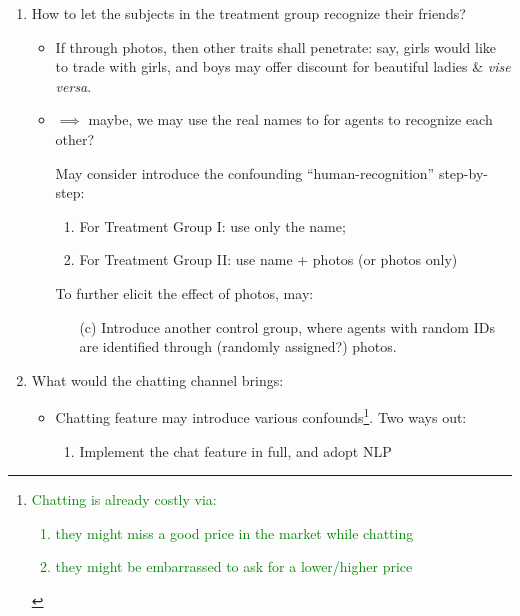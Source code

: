 \documentclass{article}
\begin{document}
\begin{enumerate}
    \item How to let the subjects in the treatment group recognize their
        friends?
        \begin{itemize}
            \item If through photos, then other traits shall penetrate: say,
                girls would like to trade with girls, and boys may offer
                discount for beautiful ladies \& \textit{vise versa}.
            \item $\implies$ maybe, we may use the real names to
                for agents to recognize each other?

                May consider introduce the confounding ``human-recognition''
                step-by-step:
                \begin{enumerate}
                    \item For Treatment Group I: use only the name;
                    \item For Treatment Group II: use name + photos (or photos
                        only)
                \end{enumerate}
                To further elicit the effect of photos, may:
                \begin{itemize}
                    \item[(c)] Introduce another control group, where agents with
                        random IDs are identified through (randomly assigned?)
                        photos.
                \end{itemize}
        \end{itemize}
    \item What would the chatting channel brings:
        \begin{itemize}
            \item Chatting feature may introduce various confounds\footnote{\textcolor{green}{Chatting is already costly via:\\
            \begin{enumerate}
                \item they might miss a good price in the market while chatting
                \item they might be embarrassed to ask for a lower/higher price
            \end{enumerate}} }. Two ways out:
                \begin{enumerate}
                    \item Implement the chat feature in full, and adopt NLP

\end{enumerate}
\end{itemize}
\end{enumerate}
\end{document}
